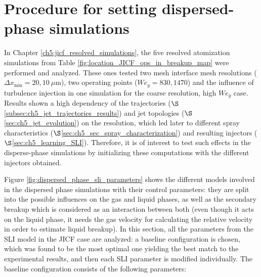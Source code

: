 \clearpage

\section{Procedure for setting dispersed-phase simulations}

In Chapter \ref{ch5:jicf_resolved_simulations}, the five resolved atomization simulations from Table \ref{fig:location_JICF_ops_in_breakup_map} were performed and analyzed. These ones tested two mesh interface mesh resolutions ($\Delta x_\mathrm{min} = 20, 10~\mu$m), two operating points ($We_g = 830, 1470$) and the influence of turbulence injection in one simulation for the coarse resolution, high $We_g$ case. Results shown a high dependency of the trajectories ($\S$\ref{subsec:ch5_jet_trajectories_results}) and jet topologies ($\S$\ref{sec:ch5_jet_evolution}) on the resolution, which led later to different spray characteristics ($\S$\ref{sec:ch5_sec_spray_characterization}) and resulting injectors ($\S$\ref{sec:ch5_learning_SLI}). Therefore, it is of interest to test such effects in the disperse-phase simulations by initializing these computations with the different injectors obtained.

Figure \ref{fig:dispersed_phase_sli_parameters} shows the different models involved in the dispersed phase simulations with their control parameters: they are split into the possible influences on the gas and liquid phases, as well as the secondary breakup which is considered as an interaction between both (even though it acts on the liquid phase, it needs the gas velocity for calculating the relative velocity in order to estimate liquid breakup). In this section, all the parameters from the SLI model in the JICF case are analyzed: a baseline configuration is chosen, which was found to be the most optimal one yielding the best match to the experimental results, and then each SLI parameter is modified individually. The baseline configuration consists of the following parameters:


